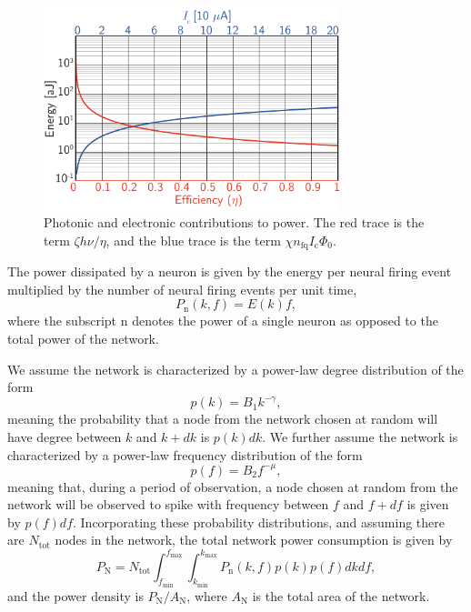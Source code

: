 \documentclass[twocolumn]{article}
\begin{document}
\begin{figure}[t!]
	\centerline{\includegraphics[width=8.6cm]{_networks_contributionsToEnergy_small.pdf}}
	\caption{\label{fig:networks_contributionsToEnergy}Photonic and electronic contributions to power. The red trace is the term $\zeta h \nu/\eta$, and the blue trace is the term $\chi n_{\mathrm{fq}} I_{\mathrm{c}} \Phi_0$.}
\end{figure}

The power dissipated by a neuron is given by the energy per neural firing event multiplied by the number of neural firing events per unit time, 
\begin{equation}
\label{eq:neuronPower}
P_{\mathrm{n}}(k,f) = E(k)f, 
\end{equation}
where the subscript $\mathrm{n}$ denotes the power of a single neuron as opposed to the total power of the network. 

We assume the network is characterized by a power-law degree distribution of the form
\begin{equation}
\label{eq:degreeProbability}
p(k) = B_1 k^{-\gamma},
\end{equation} 
meaning the probability that a node from the network chosen at random will have degree between $k$ and $k+dk$ is $p(k)dk$. We further assume the network is characterized by a power-law frequency distribution of the form
\begin{equation}
\label{eq:frequencyProbability}
p(f) = B_2 f^{-\mu},
\end{equation}
meaning that, during a period of observation, a node chosen at random from the network will be observed to spike with frequency between $f$ and $f+df$ is given by $p(f)df$. Incorporating these probability distributions, and assuming there are $N_{\mathrm{tot}}$ nodes in the network, the total network power consumption is given by
\begin{equation}
\label{eq:networkAverageTotalPower}
P_{\mathrm{N}} = N_{\mathrm{tot}}\int_{f_{\mathrm{min}}}^{f_{\mathrm{max}}} \int_{k_{\mathrm{min}}}^{k_{\mathrm{max}}} P_{\mathrm{n}}(k,f)p(k)p(f) dk df, 
\end{equation}
and the power density is $P_{\mathrm{N}}/A_{\mathrm{N}}$, where $A_{\mathrm{N}}$ is the total area of the network.
\end{document}
